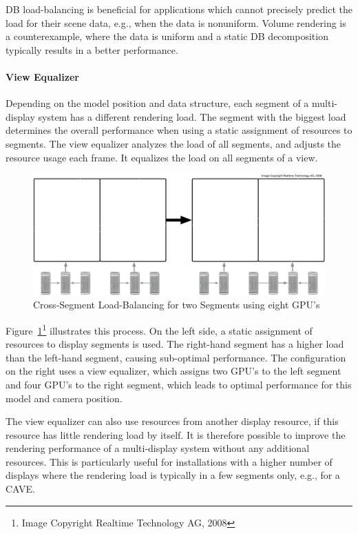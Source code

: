 \documentclass[10pt,a4]{scrartcl}
\newcommand{\fig}[1]{Figure~\ref{#1}}
\begin{document}
DB load-balancing is beneficial for applications which cannot precisely
predict the load for their scene data, e.g., when the data is
nonuniform. Volume rendering is a counterexample, where the data is
uniform and a static DB decomposition typically results in a better
performance.

\paragraph{View Equalizer}

Depending on the model position and data structure, each segment of a
multi-display system has a different rendering load. The segment with
the biggest load determines the overall performance when using a static
assignment of resources to segments. The view equalizer analyzes the
load of all segments, and adjusts the resource usage each frame. It
equalizes the load on all segments of a view.

\begin{figure}
  \includegraphics[width=.618\textwidth]{images/viewLB.pdf}
  {\caption{\label{fViewLoadBalancing}\small Cross-Segment
      Load-Balancing for two Segments using eight GPU's}}
\end{figure}
\fig{fViewLoadBalancing}\footnote{Image Copyright Realtime Technology
  AG, 2008} illustrates this process. On the left side, a static
assignment of resources to display segments is used. The right-hand
segment has a higher load than the left-hand segment, causing
sub-optimal performance. The configuration on the right uses a view
equalizer, which assigns two GPU's to the left segment and four GPU's to
the right segment, which leads to optimal performance for this model and
camera position.

The view equalizer can also use resources from another display resource,
if this resource has little rendering load by itself. It is therefore
possible to improve the rendering performance of a multi-display system
without any additional resources. This is particularly useful for
installations with a higher number of displays where the rendering load
is typically in a few segments only, e.g., for a CAVE.
\end{document}
